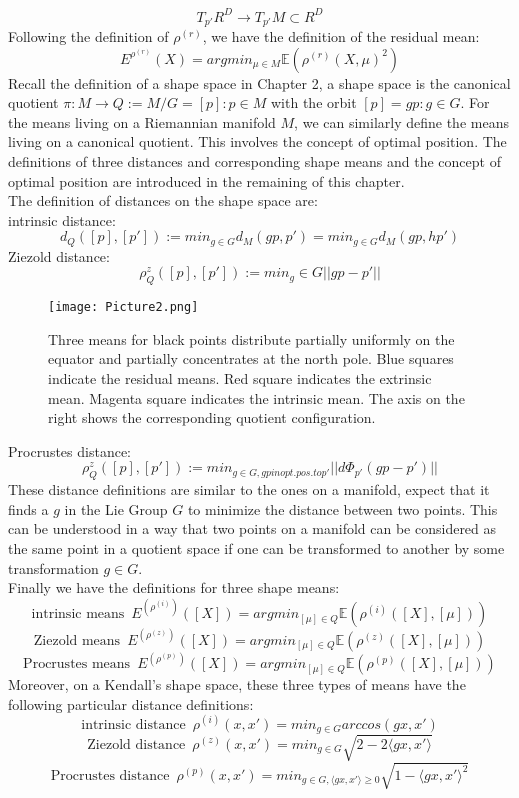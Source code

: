 \documentclass[12pt]{article}
\theoremstyle{definition}
\theoremstyle{remark}
\numberwithin{equation}{section}
\begin{document}
\[T_{p'}R^D \rightarrow T_{p'}M \subset R^D\]
Following the definition of $\rho^{(r)}$, we have the definition of the residual mean:
\[E^{\rho^{(r)}}(X)=argmin_{\mu\in M}\mathbb{E}(\rho^{(r)}(X,\mu)^2)\]
\indent Recall the definition of a shape space in Chapter 2, a shape space is the canonical quotient $\pi: M \rightarrow Q := M / G = {[p]: p\in M}$ with the orbit $[p] = {gp: g \in G}$. For the means living on a Riemannian manifold $M$, we can similarly define the means living on a canonical quotient. This involves the concept of optimal position. The definitions of three distances and corresponding shape means and the concept of optimal position are introduced in the remaining of this chapter.\\[0.2cm]
\indent The definition of distances on the shape space are: \\[0.2cm]
intrinsic distance:
\[d_Q([p],[p']):= min_{g\in G}d_M(gp,p')=min_{g\in G}d_M(gp,hp')\]
Ziezold distance:
\[\rho^z_Q([p],[p']):=min_g\in G||gp-p'||\]
\begin{figure}
\begin{center}
    \texttt{[image: Picture2.png]}
    \caption{Three means for black points distribute partially uniformly on the equator and partially concentrates at the north pole. Blue squares indicate the residual means. Red square indicates the extrinsic mean. Magenta square indicates the intrinsic mean. The axis on the right shows the corresponding quotient configuration.}
\end{center}
\end{figure}
Procrustes distance:
\[\rho^z_Q([p],[p']):=min_{g\in G, gp in opt.pos. to p'}||d\Phi_{p'}(gp-p')||\]
\indent These distance definitions are similar to the ones on a manifold, expect that it finds a $g$ in the Lie Group $G$ to minimize the distance between two points. This can be understood in a way that two points on a manifold can be considered as the same point in a quotient space if one can be transformed to another by some transformation $g\in G$.\\[0.2cm]
Finally we have the definitions for three shape means:
\[\text{intrinsic means}\,\,\, E^{(\rho^{(i)})}([X]) = argmin_{[\mu]\in Q}\mathbb{E}(\rho^{(i)}([X],[\mu]))\]
\[\text{Ziezold means}\,\,\, E^{(\rho^{(z)})}([X]) = argmin_{[\mu]\in Q}\mathbb{E}(\rho^{(z)}([X],[\mu]))\]
\[\text{Procrustes means}\,\,\, E^{(\rho^{(p)})}([X]) = argmin_{[\mu]\in Q}\mathbb{E}(\rho^{(p)}([X],[\mu]))\]
Moreover, on a Kendall's shape space, these three types of means have the following particular distance definitions:
\[\text{intrinsic distance}\,\,\, \rho^{(i)}(x,x') = min_{g\in G}arccos(gx,x')\]
\[\text{Ziezold distance}\,\,\, \rho^{(z)}(x,x') = min_{g\in G}\sqrt{2-2\langle gx,x'\rangle}\]
\[\text{Procrustes distance}\,\,\, \rho^{(p)}(x,x') = min_{g\in G, \langle gx,x'\rangle \geq 0}\sqrt{1-\langle gx,x'\rangle^2}\]
\end{document}
